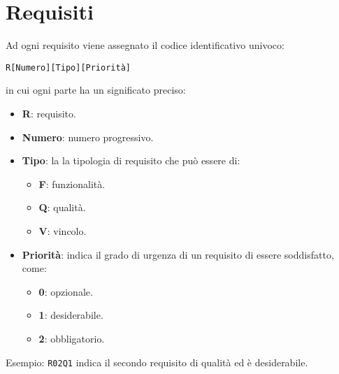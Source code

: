 \section{Requisiti}
Ad ogni requisito viene assegnato il codice identificativo univoco:
	\begin{center}
		\texttt{R[Numero][Tipo][Priorità]} 
	\end{center} 
	in cui ogni parte ha un significato preciso:
	\begin{itemize}
		\item \textbf{R}: requisito.
		\item \textbf{Numero}: numero progressivo.
		\item \textbf{Tipo}: la la tipologia di requisito che può essere di:
		\begin{itemize}
			\item \textbf{F}: funzionalità.
			\item \textbf{Q}: qualità.
			\item \textbf{V}: vincolo.
		\end{itemize}
		\item \textbf{Priorità}: indica il grado di urgenza di un requisito di essere soddisfatto, come:
		\begin{itemize}
			\item \textbf{0}: opzionale.
			\item \textbf{1}: desiderabile.
			\item \textbf{2}: obbligatorio.
		\end{itemize}
	\end{itemize}
	
	Esempio: \texttt{R02Q1} indica il secondo requisito di qualità ed è desiderabile.
	
	

\newcommand{\decrZ}{\addtocounter{vaZ}{+1}} %
\newcommand{\addNumber}[0]{\thevaZ \decrZ} %
\addtocounter{vaZ}{1}%

